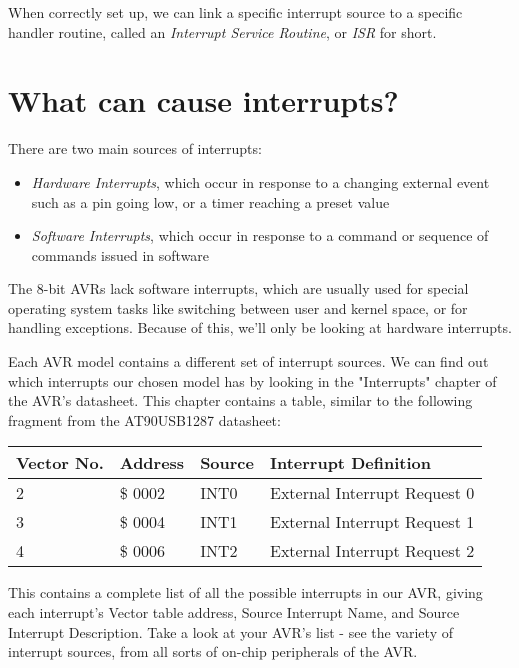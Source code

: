 \documentclass[a4paper,oneside,notitlepage]{book}
\begin{document}
When correctly set up, we can link a specific interrupt source to a specific handler routine, called an \textit{Interrupt Service Routine}, or \textit{ISR} for short.


\label{chp:InterruptCauses}
\chapter{What can cause interrupts?}

There are two main sources of interrupts:

\begin{itemize}
\item \textit{Hardware Interrupts}, which occur in response to a changing external event such as a pin going low, or a timer reaching a preset value
\item \textit{Software Interrupts}, which occur in response to a command or sequence of commands issued in software
\end{itemize}

The 8-bit AVRs lack software interrupts, which are usually used for special operating system tasks like switching between user and kernel space, or for handling exceptions. Because of this, we'll only be looking at hardware interrupts.

Each AVR model contains a different set of interrupt sources. We can find out which interrupts our chosen model has by looking in the "Interrupts" chapter of the AVR's datasheet. This chapter contains a table, similar to the following fragment from the AT90USB1287 datasheet: 

\begin{center}
\begin{tabular}{|l|l|l|l|}
	\hline
	Vector No. & Address & Source & Interrupt Definition \\
	\hline
	2          & \$ 0002   & INT0   & External Interrupt Request 0 \\
	3          & \$ 0004   & INT1   & External Interrupt Request 1 \\
	4          & \$ 0006   & INT2   & External Interrupt Request 2 \\
	\hline
\end{tabular}
\end{center}

This contains a complete list of all the possible interrupts in our AVR, giving each interrupt's Vector table address, Source Interrupt Name, and Source Interrupt Description. Take a look at your AVR's list - see the variety of interrupt sources, from all sorts of on-chip peripherals of the AVR.
\end{document}
